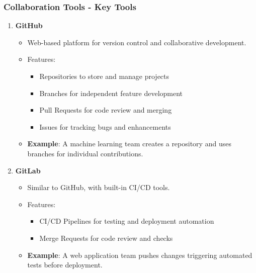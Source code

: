 \documentclass[aspectratio=169]{beamer}
\begin{document}
\begin{frame}[fragile]
    \frametitle{Collaboration Tools - Key Tools}
    \begin{enumerate}
        \item \textbf{GitHub}
            \begin{itemize}
                \item Web-based platform for version control and collaborative development.
                \item Features:
                    \begin{itemize}
                        \item Repositories to store and manage projects
                        \item Branches for independent feature development
                        \item Pull Requests for code review and merging
                        \item Issues for tracking bugs and enhancements
                    \end{itemize}
                \item \textbf{Example}: A machine learning team creates a repository and uses branches for individual contributions.
            \end{itemize}
        
        \item \textbf{GitLab}
            \begin{itemize}
                \item Similar to GitHub, with built-in CI/CD tools.
                \item Features:
                    \begin{itemize}
                        \item CI/CD Pipelines for testing and deployment automation
                        \item Merge Requests for code review and checks
                    \end{itemize}
                \item \textbf{Example}: A web application team pushes changes triggering automated tests before deployment.
            \end{itemize}
    \end{enumerate}
\end{frame}
\end{document}
